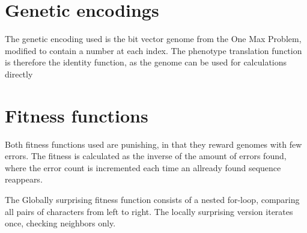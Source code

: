 \section{Genetic encodings}

The genetic encoding used is the bit vector genome from the One Max Problem, modified to contain a number at each index. The phenotype translation function is therefore the identity function, as the genome can be used for calculations directly

\section{Fitness functions}

Both fitness functions used are punishing, in that they reward genomes with few errors. The fitness is calculated as the inverse of the amount of errors found, where the error count is incremented each time an allready found sequence reappears.

The Globally surprising fitness function consists of a nested for-loop, comparing all pairs of characters from left to right. The locally surprising version iterates once, checking neighbors only.
